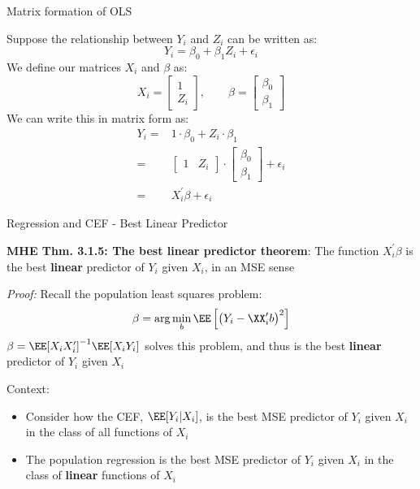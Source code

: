 \documentclass[compress, 8pt]{beamer}
\begin{document}
\begin{frame}{Matrix formation of OLS}

Suppose the relationship between $Y_i$ and $Z_i$ can be written as:
\begin{equation*}
    Y_i = \beta_0 + \beta_1 Z_i + \epsilon_i
\end{equation*}
We define our matrices $X_i$ and $\beta$ as:
\begin{equation*}
    X_i = \begin{bmatrix} 1 \\ Z_i \end{bmatrix},
    \quad\quad
    \beta = \begin{bmatrix} \beta_0 \\ \beta_1 \end{bmatrix}
\end{equation*}
We can write this in matrix form as:
\begin{align*}
    Y_i =& 1 \cdot \beta_0 + Z_i \cdot \beta_1 \\
    =& \begin{bmatrix} 1 &Z_{i} \end{bmatrix} \cdot \begin{bmatrix} \beta_0 \\ \beta_1 \end{bmatrix} + \epsilon_i \\
    =& X_i^\prime \beta + \epsilon_i
\end{align*}


\end{frame}

\begin{frame}{Regression and CEF - Best Linear Predictor}

\textbf{MHE Thm. 3.1.5: The best linear predictor theorem}: The function $X_i^\prime \beta$ is the best \textbf{linear} predictor of $Y_i$ given $X_i$, in an MSE sense

\vspace{1ex}
\emph{Proof:} Recall the population least squares problem:
\begin{equation*}
    \beta = \arg \min_b \EE \left[ \left(Y_i - \XX_i^\prime b\right)^2 \right]
\end{equation*}
$\beta = \EE [X_i X_i^\prime]^{-1} \EE [X_i Y_i]$ solves this problem, and thus is the best \textbf{linear} predictor of $Y_i$ given $X_i$

\vspace{3ex}
Context:
\begin{itemize}
    \item Consider how the CEF, $\EE [Y_i \vert X_i]$, is the best MSE predictor of $Y_i$ given $X_i$ in the class of all functions of $X_i$
    \item The population regression is the best MSE predictor of $Y_i$ given $X_i$ in the class of \textbf{linear} functions of $X_i$
\end{itemize}
\end{frame}
\end{document}
